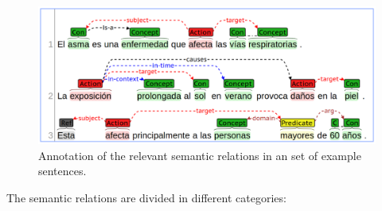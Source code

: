 \documentclass[11pt,a4paper]{article}
\begin{document}
\begin{figure}[htbp]
    \centering
    \includegraphics[width=\columnwidth]{task_b.png}
    \caption{Annotation of the relevant semantic relations in an set of example sentences.}
    \label{fig:subtaskB}
\end{figure}

The semantic relations are divided in different categories:
\end{document}
